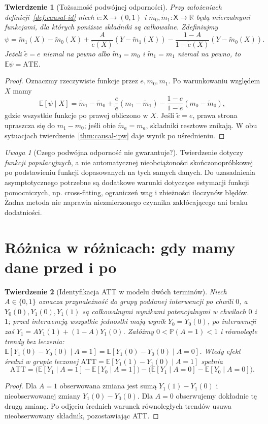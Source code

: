 \documentclass[11pt,a4paper,oneside]{report}
\numberwithin{equation}{chapter}
\theoremstyle{plain}
\newtheorem{twierdzenie}{Twierdzenie}[chapter]
\theoremstyle{definition}
\theoremstyle{remark}
\newtheorem{uwaga}{Uwaga}[chapter]
\newcommand{\R}{\mathbb R}
\newcommand{\Prob}{\mathbb P}
\newcommand{\E}{\mathbb E}
\begin{document}
\begin{twierdzenie}[Tożsamość podwójnej odporności]\label{thm:dr-id}
Przy założeniach definicji~\ref{def:causal-id} niech $\widetilde e:\mathsf X\to(0,1)$ i $\widetilde m_0,\widetilde m_1:\mathsf X\to\R$ będą mierzalnymi funkcjami, dla których poniższe składniki są całkowalne. Zdefiniujmy
\[
 \psi=\widetilde m_1(X)-\widetilde m_0(X)
 +\frac{A}{\widetilde e(X)}(Y-\widetilde m_1(X))
 -\frac{1-A}{1-\widetilde e(X)}(Y-\widetilde m_0(X)).
\]
Jeżeli $\widetilde e=e$ niemal na pewno \emph{albo} $\widetilde m_0=m_0$ i $\widetilde m_1=m_1$ niemal na pewno, to $\E\psi=\mathrm{ATE}$.
\end{twierdzenie}
\begin{proof}
Oznaczmy rzeczywiste funkcje przez $e,m_0,m_1$. Po warunkowaniu względem $X$ mamy
\[
 \E[\psi\mid X]=\widetilde m_1-\widetilde m_0
 +\frac e{\widetilde e}(m_1-\widetilde m_1)
 -\frac{1-e}{1-\widetilde e}(m_0-\widetilde m_0),
\]
gdzie wszystkie funkcje po prawej obliczono w $X$. Jeśli $\widetilde e=e$, prawa strona upraszcza się do $m_1-m_0$; jeśli obie $\widetilde m_a=m_a$, składniki resztowe znikają. W obu sytuacjach twierdzenie~\ref{thm:causal-ipw} daje wynik po uśrednieniu.
\end{proof}

\begin{uwaga}[Czego podwójna odporność nie gwarantuje?]
Twierdzenie dotyczy \emph{funkcji populacyjnych}, a nie automatycznej nieobciążoności skończonopróbkowej po podstawieniu funkcji dopasowanych na tych samych danych. Do uzasadnienia asymptotycznego potrzebne są dodatkowe warunki dotyczące estymacji funkcji pomocniczych, np. cross-fitting, ograniczeń wag i zbieżności iloczynów błędów. Żadna metoda nie naprawia niezmierzonego czynnika zakłócającego ani braku dodatniości.
\end{uwaga}

\section{Różnica w różnicach: gdy mamy dane przed i po}
\begin{twierdzenie}[Identyfikacja ATT w modelu dwóch terminów]\label{thm:did-att}
Niech $A\in\{0,1\}$ oznacza przynależność do grupy poddanej interwencji po chwili $0$, a $Y_0(0),Y_1(0),Y_1(1)$ są całkowalnymi wynikami potencjalnymi w chwilach $0$ i $1$; przed interwencją wszystkie jednostki mają wynik $Y_0=Y_0(0)$, po interwencji zaś $Y_1=A Y_1(1)+(1-A)Y_1(0)$. Załóżmy $0<\Prob(A=1)<1$ i \emph{równoległe trendy} bez leczenia:
$\E[Y_1(0)-Y_0(0)\mid A=1]=\E[Y_1(0)-Y_0(0)\mid A=0]$.
Wtedy efekt średni w grupie leczonej $\mathrm{ATT}=\E[Y_1(1)-Y_1(0)\mid A=1]$ spełnia
\[
\mathrm{ATT}=\big(\E[Y_1\mid A=1]-\E[Y_0\mid A=1]\big)
 -\big(\E[Y_1\mid A=0]-\E[Y_0\mid A=0]\big).
\]
\end{twierdzenie}
\begin{proof}
Dla $A=1$ obserwowana zmiana jest sumą $Y_1(1)-Y_1(0)$ i nieobserwowanej zmiany $Y_1(0)-Y_0(0)$. Dla $A=0$ obserwujemy dokładnie tę drugą zmianę. Po odjęciu średnich warunek równoległych trendów usuwa nieobserwowany składnik, pozostawiając ATT.
\end{proof}
\end{document}
